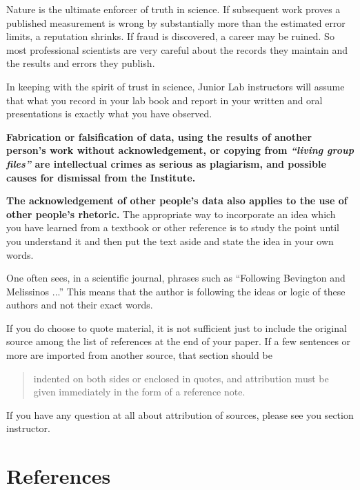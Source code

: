 \documentclass[aps,twocolumn,secnumarabic,nobalancelastpage,amsmath,amssymb,nofootinbib]{revtex4}
\begin{document}
Nature is the ultimate enforcer of truth in science. If subsequent
work proves a published measurement is wrong by substantially more
than the estimated error limits, a reputation shrinks. If fraud is
discovered, a career may be ruined. So most professional scientists
are very careful about the records they maintain and the results and
errors they publish.

In keeping with the spirit of trust in science, Junior Lab instructors
will assume that what you record in your lab book and report in your
written and oral presentations is exactly what you have observed.

{\bf Fabrication or falsification of data, using the results of
another person's work without acknowledgement, or copying from {\em
``living group files''} are intellectual crimes as serious as
plagiarism, and possible causes for dismissal from the Institute.}

{\bf The acknowledgement of other people's data also applies to the use
of other people's rhetoric.} The appropriate way to incorporate an
idea which you have learned from a textbook or other reference is to
study the point until you understand it and then put the text aside
and state the idea in your own words.

One often sees, in a scientific journal, phrases such as ``Following
Bevington and Melissinos \cite{bevington2003, melissinos1966} ...''
This means that the author is following the ideas or logic of these
authors and not their exact words.

If you do choose to quote material, it is not sufficient just to
include the original source among the list of references at the end of
your paper. If a few sentences or more are imported from another
source, that section should be

\begin{quote}indented on both sides or enclosed in
quotes, and attribution must be given immediately in the form of a
reference note.\cite{melissinos2003}
\end{quote}

If you have any question at all about attribution of sources, please
see you section instructor.

\vspace{12pt}
\section{References}
\end{document}
